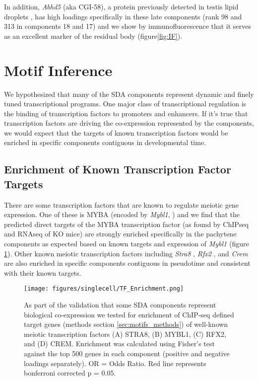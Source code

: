 In addition, \textit{Abhd5} (aka CGI-58), a protein previously detected in testis lipid droplets \parencite{Wang2015Proteomic}, has high loadings specifically in these late components (rank 98 and 313 in components 18 and 17) and we show by immunofluorescence that it serves as an excellent marker of the residual body (figure\ref{fig:IF}).


\section{Motif Inference}
We hypothesized that many of the SDA components represent dynamic and finely tuned transcriptional programs. One major class of transcriptional regulation is the binding of transcription factors to promoters and enhancers. If it's true that transcription factors are driving the co-expression represented by the components, we would expect that the targets of known transcription factors would be enriched in specific components contiguous in developmental time.

\subsection{Enrichment of Known Transcription Factor Targets}
There are some transcription factors that are known to regulate meiotic gene expression. One of these is MYBA (encoded by \textit{Mybl1}, \cite{Bolcun-Filas2011AMYB}) and we find that the predicted direct targets of the MYBA transcription factor (as found by ChIPseq and RNAseq of KO mice) are strongly enriched specifically in the pachytene components as expected based on known targets and expression of \textit{Mybl1} (figure \ref{fig:TF_Enrichment}). Other known meiotic transcription factors including \textit{Stra8} \parencite{Kojima2019Amplification}, \textit{Rfx2} \parencite{Kistler2015RFX2}, and \textit{Crem} \parencite{Nantel1996Spermiogenesis} are also enriched in specific components contiguous in pseudotime and consistent with their known targets.

\begin{figure}[H]
	\centering
	\texttt{[image: figures/singlecell/TF\_Enrichment.png]}
	\caption[Known Transcription Factor Targets Enrichment]{
	As part of the validation that some SDA components represent biological co-expression we tested for enrichment of ChIP-seq defined target genes (methods section \ref{sec:motifs_methods}) of well-known meiotic transcription factors (A) STRA8, (B) MYBL1, (C) RFX2, and (D) CREM. Enrichment was calculated using Fisher’s test against the top 500 genes in each component (positive and negative loadings separately). OR = Odds Ratio. Red line represents bonferroni corrected p = 0.05.
	}
	\label{fig:TF_Enrichment}
\end{figure}


